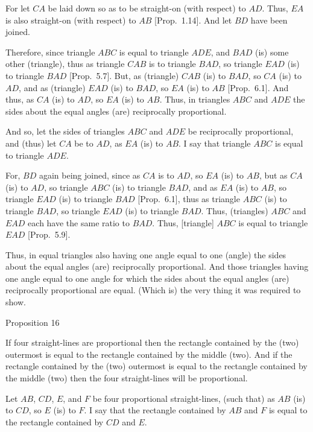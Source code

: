 For let  $CA$ be laid down so as to be  straight-on (with respect) to $AD$. Thus,
$EA$ is also straight-on (with respect) to $AB$ 
[Prop.~1.14]. And let $BD$ have been joined.

Therefore, since triangle $ABC$ is equal to triangle $ADE$, and
$BAD$ (is) some other (triangle), thus as triangle $CAB$ is
to triangle $BAD$, so triangle $EAD$ (is) to triangle $BAD$  [Prop.~5.7]. But, as (triangle)
$CAB$ (is) to $BAD$, so $CA$ (is) to $AD$, and as (triangle) $EAD$ (is) to $BAD$, so
$EA$ (is) to $AB$
[Prop.~6.1]. And thus, as $CA$ (is) to $AD$,
so $EA$ (is) to $AB$.  
Thus,  in triangles $ABC$ and
$ADE$ the sides about the equal angles (are) reciprocally proportional.

And so, let the sides of triangles $ABC$ and $ADE$ be reciprocally
proportional, and (thus) let $CA$ be to $AD$, as $EA$ (is) to $AB$. I say
that triangle $ABC$ is equal to triangle $ADE$.

For, $BD$ again being  joined, since as $CA$ is to $AD$, so $EA$ (is) to $AB$,
but as $CA$ (is) to $AD$, so triangle $ABC$ (is) to triangle
$BAD$, and as $EA$ (is) to $AB$, so triangle $EAD$ (is) to triangle $BAD$ 
[Prop.~6.1], thus as triangle
$ABC$ (is) to triangle $BAD$, so triangle $EAD$ (is) to triangle $BAD$. 
Thus, (triangles) $ABC$ and $EAD$ each have the same ratio to $BAD$. 
Thus, [triangle] $ABC$ is equal to triangle $EAD$ [Prop.~5.9].

Thus, in equal triangles also having one angle equal to
one (angle) the sides about the equal angles (are) reciprocally proportional.
And those triangles having one angle equal to one angle for which 
the sides about the equal angles (are) reciprocally proportional are equal.
(Which is) the very thing it was required to show.


\begin{center}
{\large Proposition 16}
\end{center}

If four straight-lines are proportional then the
rectangle contained by the (two) outermost is equal to the rectangle contained
by the middle (two). And if the rectangle contained by the (two) outermost
is
equal to the rectangle contained by the middle (two) then the four straight-lines
will be proportional.

\epsfysize=1.25in
\centerline{}

Let $AB$, $CD$, $E$, and $F$ be four proportional straight-lines, (such
that) as $AB$ (is) to $CD$, so $E$ (is) to $F$. I say that the rectangle contained
by  $AB$ and $F$ is equal to the rectangle contained by $CD$ and $E$.

